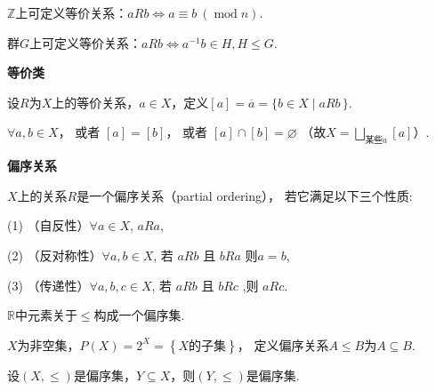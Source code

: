 \begin{example}
		$\mathbb{Z}$上可定义等价关系：$aRb \Leftrightarrow a\equiv b\ (\operatorname{mod}n)$.
	\end{example}

	\begin{example}
		群$G$上可定义等价关系：$aRb \Leftrightarrow a^{-1}b \in H , H \leqslant  G$.
	\end{example}

    \begin{definition} \textbf{等价类}\par
		设$R$为$X$上的等价关系，$a \in X$，定义$\left[a\right] = \overline{a} =\{b \in X \mid aRb\,\}$.

	\end{definition}

	\begin{proposition} $\forall a,b \in X$，
        或者 $\left[a\right]=\left[b\right]$，
        或者 $\left[a\right]\cap \left[b\right]=\varnothing $  
        （故$X=\bigsqcup\limits_{某些a}\left[a\right]$）.
	\end{proposition}


	\begin{definition} \textbf{偏序关系}\par
		$X$上的关系$R$是一个偏序关系（partial ordering），
        若它满足以下三个性质:\par
			\qquad (1) （自反性）$\forall a \in X$, $aRa$, \par
			\qquad (2) （反对称性）$\forall a,b \in X$, 若 $aRb$ 且 $bRa$ 则$a=b$, \par
            \qquad (3) （传递性）$\forall a,b,c \in X$, 若 $aRb$ 且 $bRc$ ,则 $aRc$.
	\end{definition}

    \begin{example}
        $\mathbb{R}$中元素关于$\leqslant$构成一个偏序集.
    \end{example}

    \begin{example}
        $X$为非空集，$P(X)=2^{X}=\left\{X \text{的子集}\right\}$，
        定义偏序关系$A \leqslant B$为$A\subseteq B$.
    \end{example}

    \begin{proposition}
        设$(X,\leqslant)$是偏序集，$Y \subseteq X$，则$(Y,\leqslant)$是偏序集.
    \end{proposition}

